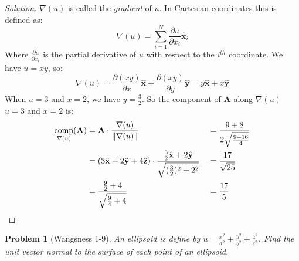 \documentclass{article}
\theoremstyle{mystyle}
\newtheorem{problem}{Problem}[section]
\DeclareMathOperator{\comp}{comp}
\begin{document}
\begin{proof}[Solution]
$\nabla(u)$ is called the \textit{gradient} of $u$. In Cartesian coordinates this is defined as:
\begin{equation*}
    \nabla(u)=\sum_{i=1}^{N}\frac{\partial u}{\partial x_{i}}\hat{\mathbf{x}}_{i}
\end{equation*}
Where $\frac{\partial u}{\partial x_{i}}$ is the partial derivative of $u$ with respect to the $i^{th}$ coordinate. We have $u=xy$, so:
\begin{equation*}
    \nabla(u)=\frac{\partial(xy)}{\partial x}\hat{\mathbf{x}}+\frac{\partial(xy)}{\partial y}\hat{\mathbf{y}}=y\hat{\mathbf{x}}+x\hat{\mathbf{y}}
\end{equation*}
When $u=3$ and $x=2$, we have $y=\frac{3}{2}$. So the component of $\mathbf{A}$ along $\nabla(u)$ $u=3$ and $x=2$ is:
\begin{align*}
    \comp_{\nabla(u)}(\mathbf{A})&=\mathbf{A}\cdot\frac{\nabla(u)}{\norm{\nabla(u)}}& &=\frac{9+8}{2\sqrt{\frac{9+16}{4}}}\\
    &=(3\hat{\mathbf{x}}+2\hat{\mathbf{y}}+4\hat{\mathbf{z}})\cdot\frac{\frac{3}{2}\hat{\mathbf{x}}+2\hat{\mathbf{y}}}{\sqrt{(\frac{3}{2})^2+2^2}}& &=\frac{17}{\sqrt{25}}\\
    &=\frac{\frac{9}{2}+4}{\sqrt{\frac{9}{4}+4}}& &=\frac{17}{5}\\
\end{align*}
\end{proof}
\begin{problem}[Wangsness 1-9]
An ellipsoid is define by $u = \frac{x^2}{a^2}+\frac{y^2}{b^2}+\frac{z^2}{c^2}$. Find the unit vector normal to the surface of each point of an ellipsoid.
\end{problem}
\end{document}
